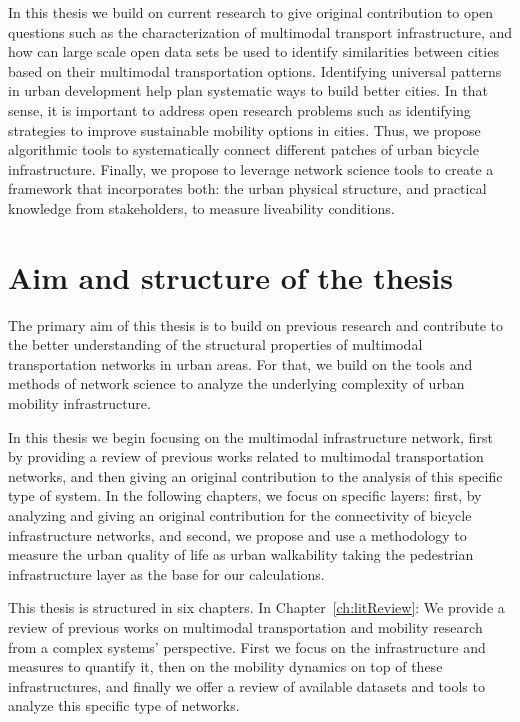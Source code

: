 In this thesis we build on current research to give original contribution to open questions such as the characterization of multimodal transport infrastructure, and how can large scale open data sets be used to identify similarities between cities based on their multimodal transportation options. Identifying universal patterns in urban development help plan systematic ways to build better cities. In that sense, it is important to address open research problems such as identifying strategies to improve sustainable mobility options in cities. Thus, we propose algorithmic tools to systematically connect different patches of urban bicycle infrastructure. Finally, we propose to leverage network science tools to create a framework that incorporates both: the urban physical structure, and practical knowledge from stakeholders, to measure liveability conditions.

\section{Aim and structure of the thesis}

The primary aim of this thesis is to build on previous research and contribute to the better understanding of the structural properties of multimodal transportation networks in urban areas. For that, we build on the tools and methods of network science to analyze the underlying complexity of urban mobility infrastructure.

In this thesis we begin focusing on the multimodal infrastructure network, first by providing a review of previous works related to multimodal transportation networks, and then giving an original contribution to the analysis of this specific type of system. In the following chapters, we focus on specific layers: first, by analyzing and giving an original contribution for the connectivity of bicycle infrastructure networks, and second, we propose and use a methodology to measure the urban quality of life as urban walkability taking the pedestrian infrastructure layer as the base for our calculations.

This thesis is structured in six chapters. In Chapter~\ref{ch:litReview}: We provide a review of previous works on multimodal transportation and mobility research from a complex systems' perspective. First we focus on the infrastructure and measures to quantify it, then on the mobility dynamics on top of these infrastructures, and finally we offer a review of available datasets and tools to analyze this specific type of networks.

